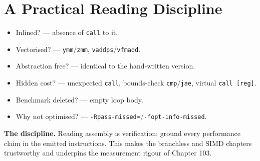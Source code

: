\section{A Practical Reading Discipline}
\begin{itemize}
\item Inlined? --- absence of \texttt{call} to it.
\item Vectorised? --- \texttt{ymm}/\texttt{zmm}, \texttt{vaddps}/\texttt{vfmadd}.
\item Abstraction free? --- identical to the hand-written version.
\item Hidden cost? --- unexpected \texttt{call}, bounds-check \texttt{cmp}/\texttt{jae}, virtual \texttt{call [reg]}.
\item Benchmark deleted? --- empty loop body.
\item Why not optimised? --- \texttt{-Rpass-missed=}/\texttt{-fopt-info-missed}.
\end{itemize}

\textbf{The discipline.} Reading assembly is verification: ground every performance claim in the emitted instructions. This makes the branchless and SIMD chapters trustworthy and underpins the measurement rigour of Chapter 103.
